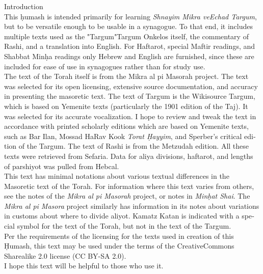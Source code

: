\begin{minipage}{\textwidth}\englishfont
	
\begin{english}
\vspace{16pt}
\Large Introduction\vspace{12pt}\\
\normalsize
This \d{h}umash is intended primarily for learning \textit{Shnayim Mikra veEchad Targum}, but to be versatile enough to be usable in a synagogue. To that end, it includes multiple texts used as the "Targum"\textemdash Targum Onkelos itself, the commentary of Rashi, and a translation into English.  For Haftarot, special Maftir readings, and Shabbat Min\d{h}a readings only Hebrew and English are furnished, since these are included for ease of use in synagogues rather than for study use.\\

The text of the Torah itself is from the Mikra al pi Masorah project. The text was selected for its open licensing, extensive source documentation, and accuracy in presenting the masoretic text.  The text of Targum is the Wikisource Targum, which is based on Yemenite texts (particularly the 1901 edition of the Taj). It was selected for its accurate vocalization.  I hope to review and tweak the text in accordance with printed scholarly editions which are based on Yemenite texts, such as Bar Ilan, Mossad HaRav Kook \textit{Torat \d{H}ayyim}, and Sperber's critical edition of the Targum.  The text of Rashi is from the Metzudah edition.  All these texts were retrieved from Sefaria. Data for aliya divisions, haftarot, and lengths of parshiyot was pulled from Hebcal. \\

This text has minimal notations about various textual differences in the Masoretic text of the Torah. For information where this text varies from others, see the notes of the \textit{Mikra al pi Masorah} project, or notes in \textit{Min\d{h}at Shai}. The \textit{Mikra al pi Masora} project similarly has information in its notes about variations in customs about where to divide aliyot. Kamatz Katan is indicated with a special symbol for the text of the Torah, but not in the text of the Targum.\\

Per the requirements of the licensing for the texts used in creation of this \d{H}umash, this text may be used under the terms of the CreativeCommons Sharealike 2.0 license (CC BY-SA 2.0).\\

I hope this text will be helpful to those who use it.

\end{english}

\end{minipage}


